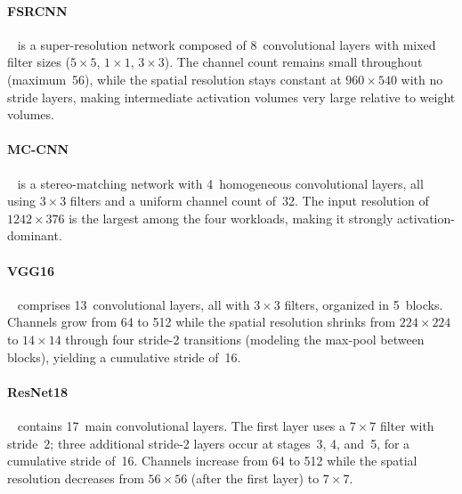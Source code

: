 \paragraph{FSRCNN}~\cite{fsrcnn} is a super-resolution network
composed of 8~convolutional layers with mixed filter sizes
($5 \times 5$, $1 \times 1$, $3 \times 3$).
The channel count remains small throughout (maximum~56), while the
spatial resolution stays constant at $960 \times 540$ with no stride
layers, making intermediate activation volumes very large relative to
weight volumes.

\paragraph{MC-CNN}~\cite{mccnn} is a stereo-matching network with
4~homogeneous convolutional layers, all using $3 \times 3$ filters and
a uniform channel count of~32.
The input resolution of $1242 \times 376$ is the largest among the four
workloads, making it strongly activation-dominant.

\paragraph{VGG16}~\cite{vgg16} comprises 13~convolutional layers,
all with $3 \times 3$ filters, organized in 5~blocks.
Channels grow from 64 to 512 while the spatial resolution shrinks from
$224 \times 224$ to $14 \times 14$ through four stride-2 transitions
(modeling the max-pool between blocks), yielding a cumulative stride
of~16.

\paragraph{ResNet18}~\cite{resnet18} contains 17~main convolutional
layers.
The first layer uses a $7 \times 7$ filter with stride~2; three
additional stride-2 layers occur at stages~3, 4, and~5, for a
cumulative stride of~16.
Channels increase from 64 to 512 while the spatial resolution
decreases from $56 \times 56$ (after the first layer) to $7 \times 7$.


































